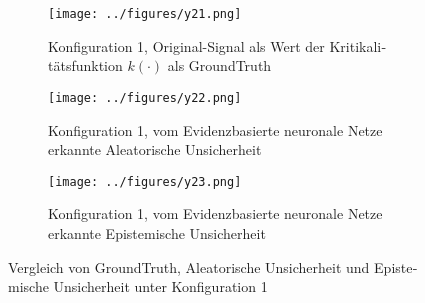 \begin{otherlanguage}{ngerman}
\begin{figure}[!ht]
  \centering

  \begin{subfigure}[t]{\textwidth}
    \centering
    \texttt{[image: ../figures/y21.png]}
    \caption{Konfiguration 1, Original-Signal als Wert der Kritikalitätsfunktion \(k(\cdot)\) als \gls{GroundTruth}}
    \label{fig:bild21}
  \end{subfigure}

  \vspace{0.5em}  %

  \begin{subfigure}[t]{\textwidth}
    \centering
    \texttt{[image: ../figures/y22.png]}
    \caption{Konfiguration 1, vom \gls{Evidenzbasierte neuronale Netze} erkannte \gls{Aleatorische Unsicherheit}}
    \label{fig:bild22}
  \end{subfigure}

  \vspace{0.5em}

  \begin{subfigure}[t]{\textwidth}
    \centering
    \texttt{[image: ../figures/y23.png]}
    \caption{Konfiguration 1, vom \gls{Evidenzbasierte neuronale Netze} erkannte \gls{Epistemische Unsicherheit}}
    \label{fig:bild23}
  \end{subfigure}

  \caption{Vergleich von \gls{GroundTruth}, \gls{Aleatorische Unsicherheit} und \gls{Epistemische Unsicherheit} unter Konfiguration 1}
  \label{fig:three_subfigures1}
\end{figure}





\end{otherlanguage}
